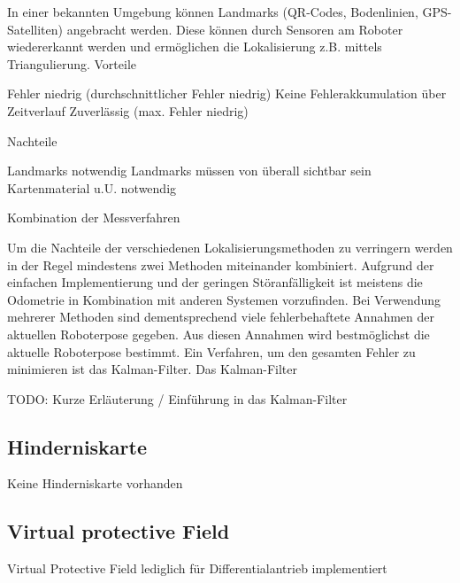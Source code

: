 In einer bekannten Umgebung können Landmarks (QR-Codes, Bodenlinien, GPS-Satelliten) angebracht werden. Diese können durch Sensoren am Roboter wiedererkannt werden und ermöglichen die Lokalisierung z.B. mittels Triangulierung.
Vorteile

    Fehler niedrig (durchschnittlicher Fehler niedrig)
    Keine Fehlerakkumulation über Zeitverlauf
    Zuverlässig (max. Fehler niedrig) 

Nachteile

    Landmarks notwendig
    Landmarks müssen von überall sichtbar sein
    Kartenmaterial u.U. notwendig 
    
Kombination der Messverfahren

Um die Nachteile der verschiedenen Lokalisierungsmethoden zu verringern werden in der Regel mindestens zwei Methoden miteinander kombiniert. Aufgrund der einfachen Implementierung und der geringen Störanfälligkeit ist meistens die Odometrie in Kombination mit anderen Systemen vorzufinden. Bei Verwendung mehrerer Methoden sind dementsprechend viele fehlerbehaftete Annahmen der aktuellen Roboterpose gegeben. Aus diesen Annahmen wird bestmöglichst die aktuelle Roboterpose bestimmt. Ein Verfahren, um den gesamten Fehler zu minimieren ist das Kalman-Filter. 
 Das Kalman-Filter

    TODO: Kurze Erläuterung / Einführung in das Kalman-Filter

\subsection{Hinderniskarte}
Keine Hinderniskarte vorhanden
\subsection{Virtual protective Field}
Virtual Protective Field lediglich für Differentialantrieb implementiert

